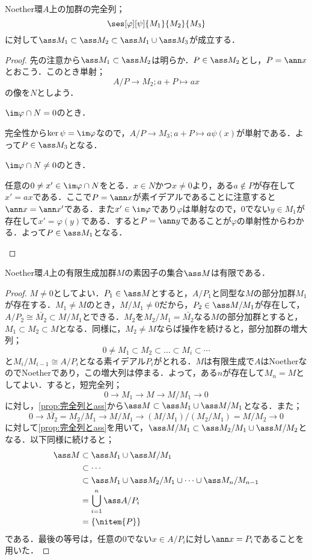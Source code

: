 \begin{prop}\label{prop:完全列とass}
	Noether環$A$上の加群の完全列；
	\[\ses[\varphi][\psi]{M_1}{M_2}{M_3}\]
	に対して$\ass M_1\subset\ass M_2\subset \ass M_1\cup\ass M_3$が成立する．
\end{prop}
\begin{proof}
	先の注意から$\ass M_1\subset\ass M_2$は明らか．$P\in\ass M_2$とし，$P=\ann x$とおこう．このとき単射；
	\[A/P\to M_2;a+P\mapsto ax\]
	の像を$N$としよう．
	
	\begin{sakura}
		\item $\im\varphi\cap N=0$のとき．
		
		完全性から$\ker\psi=\im\varphi$なので，$A/P\to M_3;a+P\mapsto a\psi(x)$が単射である．よって$P\in\ass M_3$となる．
		
		\item $\im\varphi\cap N\neq0$のとき．
		
		任意の$0\neq x'\in\im\varphi\cap N$をとる．$x\in N$かつ$x\neq0$より，ある$a\not\in P$が存在して$x'=ax$である．ここで$P=\ann x$が素イデアルであることに注意すると$\ann x=\ann x'$である．また$x'\in\im\varphi$であり$\varphi$は単射なので，$0$でない$y\in M_1$が存在して$x'=\varphi(y)$である．すると$P=\ann y$であることが$\varphi$の単射性からわかる．よって$P\in\ass M_1$となる．
	\end{sakura}
\end{proof}
\begin{thm}\label{thm:Assは有限}
	Noether環$A$上の有限生成加群$M$の素因子の集合$\ass M$は有限である．
\end{thm}
\begin{proof}
	$M\neq0$としてよい．$ P_1\in\ass M$とすると，$A/ P_1$と同型な$M$の部分加群$M_1$が存在する．$M_1\neq M$のとき，$M/M_1\neq0$だから，$ P_2\in\ass M/M_1$が存在して，$A/ P_2\cong\bar{M_2}\subset M/M_1$とできる．$M_2$を$M_2/M_1=\bar{M_2}$なる$M$の部分加群とすると，$M_1\subset M_2\subset M$となる．同様に，$M_2\neq M$ならば操作を続けると，部分加群の増大列；
	\[0\neq M_1\subset M_2\subset\dots\subset M_i\subset\cdots\]
	と$M_i/M_{i-1}\cong A/ P_i$となる素イデアル$ P_i$がとれる．$M$は有限生成で$A$はNoetherなのでNoetherであり，この増大列は停まる．よって，ある$n$が存在して$M_n=M$としてよい．すると，短完全列；
	\[0\longrightarrow M_1\longrightarrow M\longrightarrow M/M_1\longrightarrow0\]
	に対し，\ref{prop:完全列とass}から$\ass M\subset \ass M_1\cup \ass M/M_1$となる．また；
	\[0\longrightarrow \bar{M_2}=M_2/M_1\longrightarrow M/M_1\longrightarrow (M/M_1)/(M_2/M_1)=M/M_2\longrightarrow0\]
	に対して\ref{prop:完全列とass}を用いて，$\ass M/M_1\subset \ass M_2/M_1\cup \ass M/M_2$となる．以下同様に続けると；
	\[\begin{aligned}
		\ass M&\subset\ass M_1\cup \ass M/M_1\\
		&\subset\cdots\\
		&\subset\ass M_1\cup\ass M_2/M_1\cup\dots\cup\ass M_n/M_{n-1}\\
		&=\bigcup_{i=1}^n\ass A/ P_i\\
		&=\{\nitem{ P}\}
	\end{aligned}\]
	である．最後の等号は，任意の0でない$x\in A/ P_i$に対し$\ann x= P_i$であることを用いた．
\end{proof}

